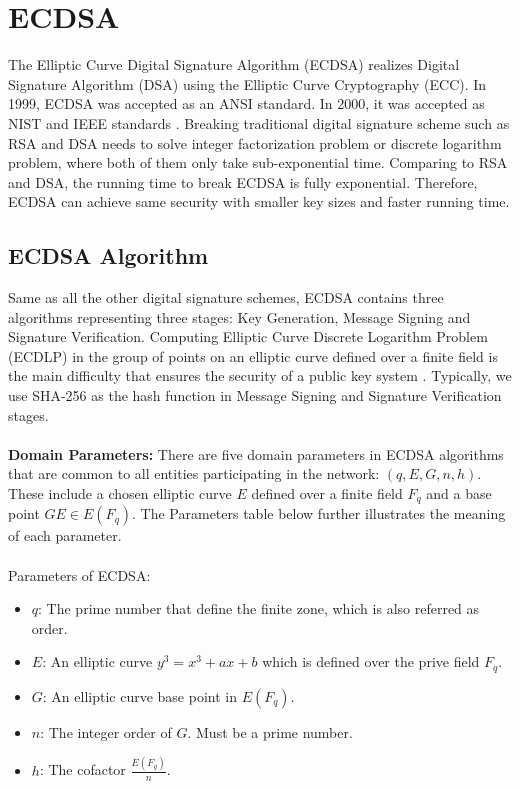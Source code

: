 \documentclass[10pt,sigconf]{acmart}
\begin{document}




\section{ECDSA}

The Elliptic Curve Digital Signature Algorithm (ECDSA) realizes Digital Signature Algorithm (DSA) using the Elliptic Curve Cryptography (ECC). In 1999, ECDSA was accepted as an ANSI standard. In 2000, it was accepted as NIST and IEEE standards \cite{johnson2001elliptic}. Breaking traditional digital signature scheme such as RSA and DSA needs to solve integer factorization problem or discrete logarithm problem, where both of them only take sub-exponential time. Comparing to RSA and DSA, the running time to break ECDSA is fully exponential. Therefore, ECDSA can achieve same security with smaller key sizes and faster running time.

\subsection{ECDSA Algorithm}

Same as all the other digital signature schemes, ECDSA contains three algorithms representing three stages: Key Generation, Message Signing and Signature Verification. Computing Elliptic Curve Discrete Logarithm Problem (ECDLP) in the group of points on an elliptic curve defined over a finite field is the main difficulty that ensures the security of a public key system \cite{imem2015comparison}. Typically, we use SHA-256 as the hash function in Message Signing and Signature Verification stages.
\\
\\
\noindent \textbf{Domain Parameters:} \quad There are five domain parameters in ECDSA algorithms that are common to all entities participating in the network: $(q, E, G, n, h)$. These include a chosen elliptic curve $E$ defined over a finite field $F_q$ and a base point $GE \in E(F_q)$. The Parameters table below further illustrates the meaning of each parameter.
\\
\\
\noindent Parameters of ECDSA:
\begin{itemize}
    \item $q$: The prime number that define the finite zone, which is also referred as order.
    \item $E$: An elliptic curve $y^3 = x^3 + ax + b$ which is defined over the prive field $F_q$.
    \item $G$: An elliptic curve base point in $E(F_q)$.
    \item $n$: The integer order of $G$. Must be a prime number.
    \item $h$: The cofactor $\frac{E(F_q)}{n}$.
\end{itemize}
\end{document}
